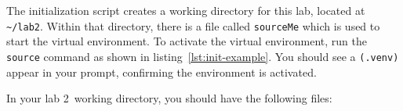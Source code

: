 \documentclass[11pt]{article}
\def\thelab{2}
\begin{document}
The initialization script creates a working directory for this lab, located at \texttt{\textasciitilde/lab\thelab}.
Within that directory, there is a file called \texttt{sourceMe} which is used to start the virtual environment.
To activate the virtual environment, run the \texttt{source} command as shown in listing~\ref{lst:init-example}.
You should see a \texttt{(.venv)} appear in your prompt, confirming the environment is activated.


In your lab \thelab~working directory, you should have the following files:
\end{document}
